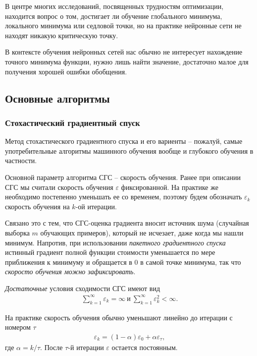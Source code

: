 \documentclass[%
	11pt,
	a4paper,
	utf8,
]{article}
\begin{document}
В центре многих исследований, посвященных трудностям оптимизации, находится вопрос о том, достигает ли обучение глобального минимума, локального минимума или седловой точки, но на практике нейронные сети не находят никакую критическую точку.

В контексте обучения нейронных сетей нас обычно не интересует нахождение точного минимума функции, нужно лишь найти значение, достаточно малое для получения хорошей ошибки обобщения.

\subsection{Основные алгоритмы}

\subsubsection{Стохастический градиентный спуск}

Метод стохастического градиентного спуска и его вариенты -- пожалуй, самые употребительные алгоритмы машинного обучения вообще и глубокого обучения в частности.

Основной параметр алгоритма СГС -- скорость обучения. Ранее при описании СГС мы считали скорость обучения $ \varepsilon $ фиксированной. На практике же необходимо постепенно уменьшать ее со временем, поэтому будем обозначать $ \varepsilon_k $ скорость обучения на $ k $-ой итерации.

Связано это с тем, что СГС-оценка градиента вносит источник шума (случайная выборка $ m $ обучающих примеров), который не исчезает, даже когда мы нашли минимум. Напротив, при использовании \emph{пакетного градиентного спуска} истинный градиент полной функции стоимости уменьшается по мере приближения к минимуму и обращается в 0 в самой точке минимума, так что \emph{скоросто обучения можно зафиксировать}.

\emph{Достаточные} условия сходимости СГС имеют вид
\begin{align*}
	\sum_{k=1}^\infty \varepsilon_k = \infty \ \text{и} \ \sum_{k=1}^\infty \varepsilon^2_k < \infty.
\end{align*}

На практике скорость обучения обычно уменьшают линейно до итерации с номером $ \tau $
\begin{align*}
	\varepsilon_k = (1 - \alpha) \varepsilon_0 +\alpha \varepsilon_\tau,
\end{align*}
где $ \alpha = k / \tau $. После $ \tau $-й	итерации $ \varepsilon $ остается постоянным.
\end{document}
